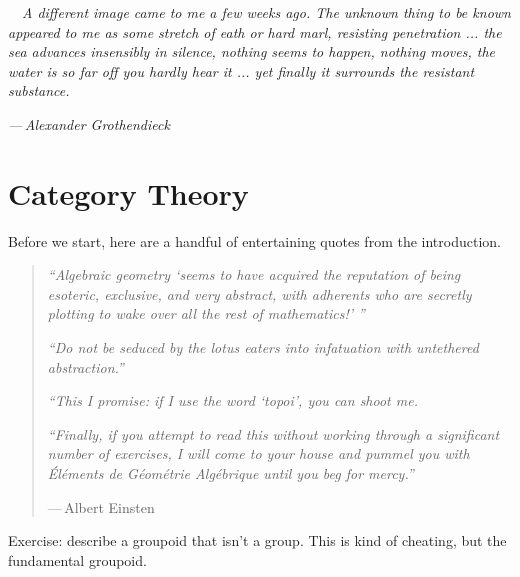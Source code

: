 \epigraph{$\quad$\emph{A different image came to me a few weeks ago. The unknown thing to be known appeared to me as some stretch of eath or hard marl, resisting penetration ... the sea advances insensibly in silence, nothing seems to happen, nothing moves, the water is so far off you hardly hear it ... yet finally it surrounds the resistant substance.}}{\emph{—\,Alexander Grothendieck}}
\section{Category Theory}
Before we start, here are a handful of entertaining quotes from the introduction.
\begin{quotation}
    \emph{``Algebraic geometry `seems to have acquired the reputation of being esoteric, exclusive, and very abstract, with adherents who are secretly plotting to wake over all the rest of mathematics!' ''}

    \emph{``Do not be seduced by the lotus eaters into infatuation with untethered abstraction.''}

    \emph{``This I promise: if I use the word `topoi', you can shoot me.}

    \emph{``Finally, if you attempt to read this without working through a significant number of exercises, I will come to your house and pummel you with \emph{\'El\'ements de G\'eom\'etrie Alg\'ebrique} until you beg for mercy.''}

    —\,Albert Einsten
\end{quotation}
Exercise: describe a groupoid that isn't a group. This is kind of cheating, but the fundamental groupoid. 
